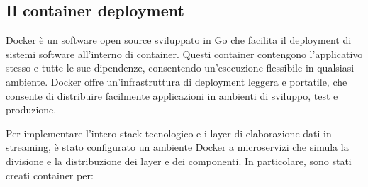 \subsection{Il container deployment}
Docker è un software open source sviluppato in Go che facilita il deployment di sistemi software all'interno di container. Questi container contengono l'applicativo stesso e tutte le sue dipendenze, consentendo un'esecuzione flessibile in qualsiasi ambiente. Docker offre un'infrastruttura di deployment leggera e portatile, che consente di distribuire facilmente applicazioni in ambienti di sviluppo, test e produzione.

Per implementare l'intero stack tecnologico e i layer di elaborazione dati in streaming, è stato configurato un ambiente Docker a microservizi che simula la divisione e la distribuzione dei layer e dei componenti. In particolare, sono stati creati container per:
